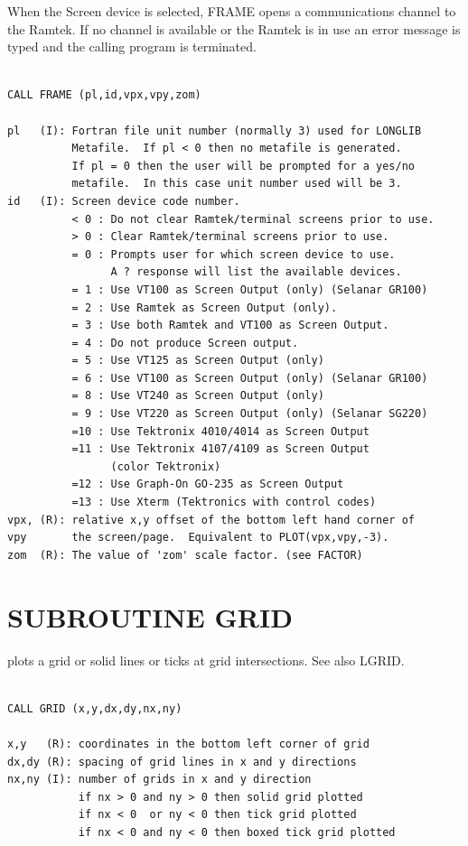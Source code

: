 \documentclass[11pt]{report}
\begin{document}
When the  Screen device is selected, FRAME opens a communications
channel to the Ramtek.  If no channel is available or the Ramtek is in use an
error message is typed and the calling program is terminated.
\begin{verbatim}

CALL FRAME (pl,id,vpx,vpy,zom)

pl   (I): Fortran file unit number (normally 3) used for LONGLIB
          Metafile.  If pl < 0 then no metafile is generated.
          If pl = 0 then the user will be prompted for a yes/no
          metafile.  In this case unit number used will be 3.
id   (I): Screen device code number.
          < 0 : Do not clear Ramtek/terminal screens prior to use.
          > 0 : Clear Ramtek/terminal screens prior to use.
          = 0 : Prompts user for which screen device to use.
                A ? response will list the available devices.
          = 1 : Use VT100 as Screen Output (only) (Selanar GR100)
          = 2 : Use Ramtek as Screen Output (only).
          = 3 : Use both Ramtek and VT100 as Screen Output.
          = 4 : Do not produce Screen output.
          = 5 : Use VT125 as Screen Output (only)
          = 6 : Use VT100 as Screen Output (only) (Selanar GR100)
          = 8 : Use VT240 as Screen Output (only)
          = 9 : Use VT220 as Screen Output (only) (Selanar SG220)
          =10 : Use Tektronix 4010/4014 as Screen Output
          =11 : Use Tektronix 4107/4109 as Screen Output
                (color Tektronix)
          =12 : Use Graph-On GO-235 as Screen Output
          =13 : Use Xterm (Tektronics with control codes)
vpx, (R): relative x,y offset of the bottom left hand corner of
vpy       the screen/page.  Equivalent to PLOT(vpx,vpy,-3).
zom  (R): The value of 'zom' scale factor. (see FACTOR)
\end{verbatim}

\section{SUBROUTINE GRID}

 plots a  grid or solid lines or ticks at
grid intersections.  See also LGRID.
\begin{verbatim}

CALL GRID (x,y,dx,dy,nx,ny)

x,y   (R): coordinates in the bottom left corner of grid
dx,dy (R): spacing of grid lines in x and y directions
nx,ny (I): number of grids in x and y direction
           if nx > 0 and ny > 0 then solid grid plotted
           if nx < 0  or ny < 0 then tick grid plotted
           if nx < 0 and ny < 0 then boxed tick grid plotted
\end{verbatim}
\end{document}
